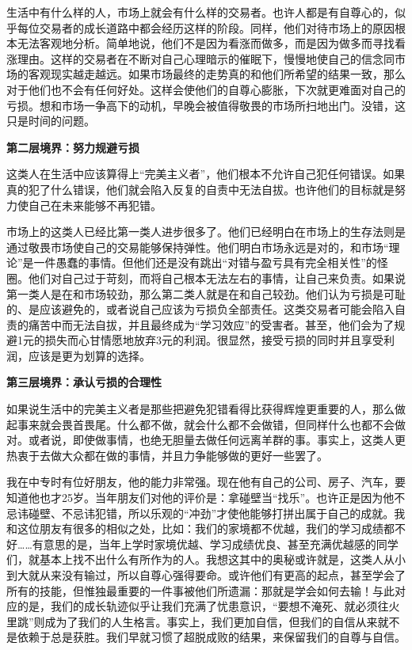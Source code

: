 生活中有什么样的人，市场上就会有什么样的交易者。也许人都是有自尊心的，似乎每位交易者的成长道路中都会经历这样的阶段。同样，他们对待市场上的原因根本无法客观地分析。简单地说，他们不是因为看涨而做多，而是因为做多而寻找看涨理由。这样的交易者在不断对自己心理暗示的催眠下，慢慢地使自己的信念同市场的客观现实越走越远。如果市场最终的走势真的和他们所希望的结果一致，那么对于他们也不会有任何好处。这样会使他们的自尊心膨胀，下次就更难面对自己的亏损。想和市场一争高下的动机，早晚会被值得敬畏的市场所扫地出门。没错，这只是时间的问题。

\textbf{第二层境界：努力规避亏损}

这类人在生活中应该算得上“完美主义者”，他们根本不允许自己犯任何错误。如果真的犯了什么错误，他们就会陷入反复的自责中无法自拔。也许他们的目标就是努力使自己在未来能够不再犯错。

市场上的这类人已经比第一类人进步很多了。他们已经明白在市场上的生存法则是通过敬畏市场使自己的交易能够保持弹性。他们明白市场永远是对的，和市场“理论”是一件愚蠢的事情。但他们还是没有跳出“对错与盈亏具有完全相关性”的怪圈。他们对自己过于苛刻，而将自己根本无法左右的事情，让自己来负责。如果说第一类人是在和市场较劲，那么第二类人就是在和自己较劲。他们认为亏损是可耻的、是应该避免的，或者说自己应该为亏损负全部责任。这类交易者可能会陷入自责的痛苦中而无法自拔，并且最终成为“学习效应”的受害者。甚至，他们会为了规避1元的损失而心甘情愿地放弃3元的利润。很显然，接受亏损的同时并且享受利润，应该是更为划算的选择。

\textbf{第三层境界：承认亏损的合理性}

如果说生活中的完美主义者是那些把避免犯错看得比获得辉煌更重要的人，那么做起事来就会畏首畏尾。什么都不做，就会什么都不会做错，但同样什么也都不会做对。或者说，即使做事情，也绝无胆量去做任何远离羊群的事。事实上，这类人更热衷于去做大众都在做的事情，并且力争能够做的更好一些罢了。

我在中专时有位好朋友，他的能力非常强。现在他有自己的公司、房子、汽车，要知道他也才25岁。当年朋友们对他的评价是：拿碰壁当“找乐”。也许正是因为他不忌讳碰壁、不忌讳犯错，所以乐观的“冲劲”才使他能够打拼出属于自己的成就。我和这位朋友有很多的相似之处，比如：我们的家境都不优越，我们的学习成绩都不好……有意思的是，当年上学时家境优越、学习成绩优良、甚至充满优越感的同学们，就基本上找不出什么有所作为的人。我想这其中的奥秘或许就是，这类人从小到大就从来没有输过，所以自尊心强得要命。或许他们有更高的起点，甚至学会了所有的技能，但惟独最重要的一件事被他们所遗漏：那就是学会如何去输！与此对应的是，我们的成长轨迹似乎让我们充满了忧患意识，“要想不淹死、就必须往火里跳”则成为了我们的人生格言。事实上，我们更加自信，但我们的自信从来就不是依赖于总是获胜。我们早就习惯了超脱成败的结果，来保留我们的自尊与自信。

